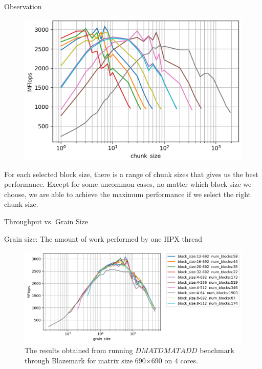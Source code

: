 \documentclass[10pt]{beamer}
\begin{document}
\begin{frame}{Observation}
	\begin{outline}
		\begin{figure}
			\includegraphics[scale=0.2]{images/fig5_cropped.png}			
		\end{figure}
		\1For each selected block size, there is a range of chunk sizes that gives us the best performance. 
		\1Except for some uncommon cases, no matter which block size we choose, we are able to achieve the maximum performance if we select the right chunk size.  
	\end{outline}
\end{frame}

\begin{frame}{Throughput vs. Grain Size}
	\begin{outline}
		Grain size: The amount of work performed by one HPX thread
		
		\begin{figure}[H]
			\centering\includegraphics[width=1\linewidth]{images/fig6.png}
			\caption{The results obtained from running $DMATDMATADD$ benchmark through Blazemark for matrix size 690$\times$690 on $4$ cores.}	
			\label{fig6}
		\end{figure}
	
	\end{outline}
\end{frame}
\end{document}
